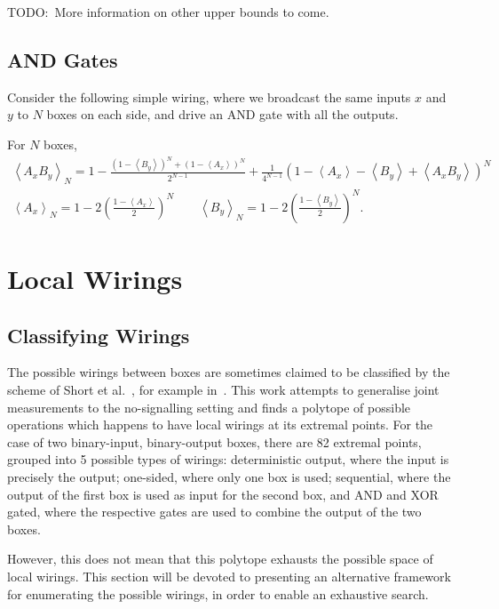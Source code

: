 \documentclass[10pt, a4paper]{article}
\newcommand{\?}{\mathrel{?}} %
\newcommand{\angleb}[1]{\left\langle #1 \right\rangle} %
\numberwithin{equation}{section} %
\theoremstyle{definition}
\theoremstyle{plain}
\theoremstyle{plain}
\begin{document}
  TODO:\ More information on other upper bounds to come.

  \subsection{AND Gates}

    Consider the following simple wiring, where we broadcast the same inputs \(x\) and \(y\) to \(N\) boxes on each side, and drive an AND gate with all the outputs.

    For \(N\) boxes,
    \begin{gather}
      \angleb{A_x B_y}_{N} = 1 - \frac{{(1-\angleb{B_y})}^N + {(1-\angleb{A_x})}^N}{2^{N-1}} + \frac{1}{4^{N-1}} {(1-\angleb{A_x} - \angleb{B_y} + \angleb{A_x B_y})}^{N} \\
      \angleb{A_x}_{N} = 1 - 2 {\left(\frac{1-\angleb{A_x}}{2}\right)}^N \qquad \angleb{B_y}_{N} = 1 - 2 {\left(\frac{1-\angleb{B_y}}{2}\right)}^N.
    \end{gather}

    \section{Local Wirings}

    \subsection{Classifying Wirings}

    The possible wirings between boxes are sometimes claimed to be classified by the scheme of Short et al.~\cite{ShortEntangleSwap}, for example in~\cite{ShortClassClaim}. This work attempts to generalise joint measurements to the no-signalling setting and finds a polytope of possible operations which happens to have local wirings at its extremal points. For the case of two binary-input, binary-output boxes, there are 82 extremal points, grouped into 5 possible types of wirings: deterministic output, where the input is precisely the output; one-sided, where only one box is used; sequential, where the output of the first box is used as input for the second box, and AND and XOR gated, where the respective gates are used to combine the output of the two boxes.

    However, this does not mean that this polytope exhausts the possible space of local wirings. This section will be devoted to presenting an alternative framework for enumerating the possible wirings, in order to enable an exhaustive search.
\end{document}
